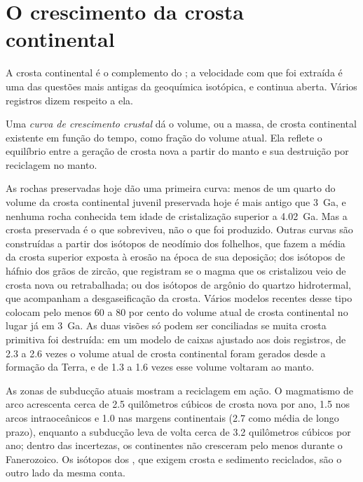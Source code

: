 \section{O crescimento da crosta continental}

A crosta continental é o complemento do ; a velocidade com que foi
extraída é uma das questões mais antigas da geoquímica isotópica, e continua
aberta. Vários registros dizem respeito a ela.

\begin{definition}\label{def:b2:isotope-geochemistry:growth}
Uma \emph{curva de crescimento crustal} dá o volume, ou a
massa, de crosta continental existente em função do tempo, como fração do
volume atual. Ela reflete o equilíbrio entre a geração de crosta nova
a partir do manto e sua destruição por reciclagem no manto.
\end{definition}

As rochas preservadas hoje dão uma primeira curva: menos de um quarto do volume
da crosta continental juvenil preservada hoje é mais antigo que \qty{3}{Ga}, e
nenhuma rocha conhecida tem idade de cristalização superior a \qty{4.02}{Ga}. Mas a
crosta preservada é o que sobreviveu, não o que foi produzido. Outras curvas são construídas a partir
dos isótopos de neodímio dos folhelhos, que fazem a média da crosta superior exposta à
erosão na época de sua deposição; dos isótopos de háfnio dos grãos de
zircão, que registram se o magma que os cristalizou veio de crosta nova ou
retrabalhada; ou dos isótopos de argônio do quartzo hidrotermal, que acompanham
a desgaseificação da crosta. Vários modelos recentes desse tipo colocam pelo menos 60
a 80 por cento do volume atual de crosta continental no lugar já em
\qty{3}{Ga}. As duas visões só podem ser conciliadas se muita crosta primitiva
foi destruída: em um modelo de caixas ajustado aos dois registros, de 2.3 a 2.6 vezes o
volume atual de crosta continental foram gerados desde a formação da Terra,
e de 1.3 a 1.6 vezes esse volume voltaram ao manto.

As zonas de subducção atuais mostram a reciclagem em ação. O magmatismo de arco acrescenta
cerca de 2.5 quilômetros cúbicos de crosta nova por ano, 1.5 nos arcos intraoceânicos e
1.0 nas margens continentais (2.7 como média de longo prazo), enquanto a subducção
leva de volta cerca de 3.2 quilômetros cúbicos por ano; dentro das incertezas, os
continentes não cresceram pelo menos durante o Fanerozoico. Os isótopos dos , que exigem crosta e sedimento reciclados, são o outro lado da
mesma conta.

